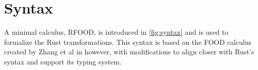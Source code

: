 \documentclass[ oneside,%
                    author={James Elgar},
                    degree={MEng},
                     title={Bidirectional transformer between functional and \\ object-oriented programming in Rust},
                  subtitle={}]{dissertation}
\newcommand{\weixin}{Zhang et al }
\begin{document}




\section{Syntax}

A minimal calculus, RFOOD, is introduced in \autoref{fig:syntax} and is used to formalize the Rust transformations. This syntax is based on the FOOD calculus created by \weixin in \cite{food} however, with modifications to align closer with Rust's syntax and support its typing system. 
\end{document}
